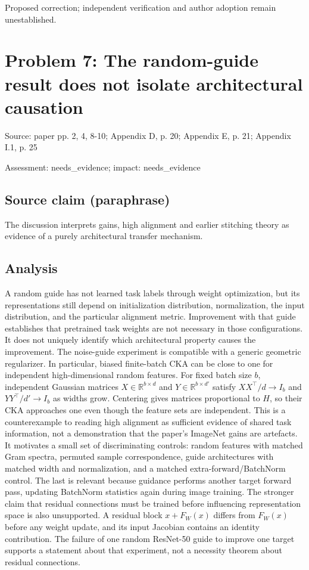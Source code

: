 \documentclass[11pt]{article}
\begin{document}
Proposed correction; independent verification and author adoption remain unestablished.

\section*{Problem 7: The random-guide result does not isolate architectural causation}

Source: paper pp. 2, 4, 8-10; Appendix D, p. 20; Appendix E, p. 21; Appendix I.1, p. 25

Assessment: needs\_evidence; impact: needs\_evidence

\subsection*{Source claim (paraphrase)}

The discussion interprets gains, high alignment and earlier stitching theory as evidence of a purely architectural transfer mechanism.

\subsection*{Analysis}

A random guide has not learned task labels through weight optimization, but its representations still depend on initialization distribution, normalization, the input distribution, and the particular alignment metric. Improvement with that guide establishes that pretrained task weights are not necessary in those configurations. It does not uniquely identify which architectural property causes the improvement. The noise-guide experiment is compatible with a generic geometric regularizer. In particular, biased finite-batch CKA can be close to one for independent high-dimensional random features. For fixed batch size \(b\), independent Gaussian matrices \(X\in\mathbb R^{b\times d}\) and \(Y\in\mathbb R^{b\times d'}\) satisfy \(XX^\top/d\to I_b\) and \(YY^\top/d'\to I_b\) as widths grow. Centering gives matrices proportional to \(H\), so their CKA approaches one even though the feature sets are independent. This is a counterexample to reading high alignment as sufficient evidence of shared task information, not a demonstration that the paper's ImageNet gains are artefacts. It motivates a small set of discriminating controls: random features with matched Gram spectra, permuted sample correspondence, guide architectures with matched width and normalization, and a matched extra-forward/BatchNorm control. The last is relevant because guidance performs another target forward pass, updating BatchNorm statistics again during image training. The stronger claim that residual connections must be trained before influencing representation space is also unsupported. A residual block \(x+F_W(x)\) differs from \(F_W(x)\) before any weight update, and its input Jacobian contains an identity contribution. The failure of one random ResNet-50 guide to improve one target supports a statement about that experiment, not a necessity theorem about residual connections.
\end{document}
